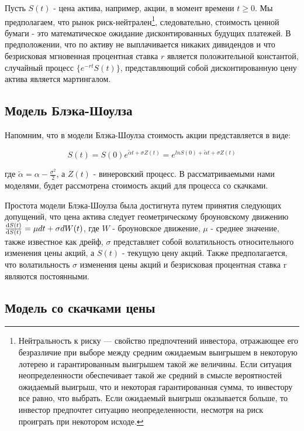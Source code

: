 \documentclass[a4paper,12pt]{article}
\theoremstyle{definition}
\begin{document}
Пусть $S(t)$ - цена актива, например, акции, в момент времени $t \ge 0$. Мы предполагаем, что рынок риск-нейтрален\footnote{Нейтральность к риску — свойство предпочтений инвестора, отражающее его безразличие при выборе между средним ожидаемым выигрышем в некоторую лотерею и гарантированным выигрышем такой же величины. Если ситуация неопределенности обеспечивает такой же средний в смысле вероятностей ожидаемый выигрыш, что и некоторая гарантированная сумма, то инвестору все равно, что выбрать. Если ожидаемый выигрыш оказывается больше, то инвестор предпочтет ситуацию неопределенности, несмотря на риск проиграть при некотором исходе.}, следовательно, стоимость ценной бумаги - это математическое ожидание дисконтированных будущих платежей. В предположении, что по активу не выплачивается никаких дивидендов и что безрисковая мгновенная процентная ставка $r$ является положительной константой, случайный процесс $\{e^{-rt} S(t)\}$, представляющий собой дисконтированную цену актива  является мартингалом.

\subsection{Модель Блэка-Шоулза}

Напомним, что в модели Блэка-Шоулза стоимость акции представляется в виде:

\begin{equation}\label{eq:black_sholes_equation}
    S(t) = S(0) e^{\tilde{\alpha} t + \sigma Z(t)} = e^{ln S(0) + \tilde{\alpha} t + \sigma Z(t)}
\end{equation}

где $\tilde{\alpha} = \alpha - \frac{\sigma^2}{2}$, а $Z (t)$ - винеровский процесс. В рассматриваемыми нами моделями, будет рассмотрена стоимость акций для процесса со скачками.

Простота модели Блэка-Шоулза была достигнута путем принятия следующих допущений, что цена актива следует геометрическому броуновскому движению $\dv{S(t)}{S(t)} = \mu dt + \sigma dW(t)$, где $W$ - броуновское движение, $\mu$ - среднее значение, также известное как дрейф, $\sigma$ представляет собой волатильность относительного изменения цены акций, а $S(t)$ - текущую цену акций. Также предполагается, что волатильность $\sigma$ изменения цены акций и безрисковая процентная ставка r являются постоянными.

\subsection{Модель со скачками цены}
\end{document}
